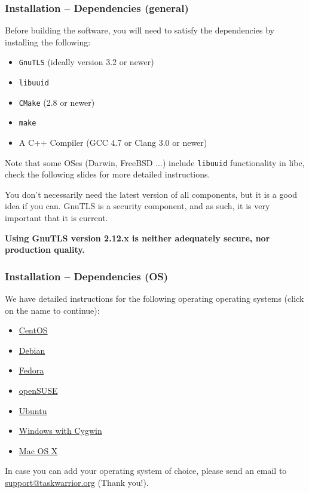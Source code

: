 \documentclass[t,handout]{beamer}
\begin{document}
\begin{frame}[fragile]\frametitle{Installation -- Dependencies (general)}
    Before building the software, you will need to satisfy the dependencies by installing the following:

    \begin{itemize}
        \item \verb+GnuTLS+ (ideally version 3.2 or newer)
        \item \verb+libuuid+
        \item \verb+CMake+ (2.8 or newer)
        \item \verb+make+
        \item A C++ Compiler (GCC 4.7 or Clang 3.0 or newer)
    \end{itemize}

    Note that some OSes (Darwin, FreeBSD ...) include \verb+libuuid+ functionality in libc, check the following slides for more detailed instructions.

    You don't necessarily need the latest version of all components, but it is a good idea if you can.  GnuTLS is a security component, and as such, it is very important that it is current.

    \textbf{Using GnuTLS version 2.12.x is neither adequately secure, nor production quality.}
\end{frame}

\begin{frame}[fragile]\frametitle{Installation -- Dependencies (OS)}
    We have detailed instructions for the following operating operating systems (click on the name to continue):

    \begin{itemize}
        \item \hyperlink{centos}{CentOS}
        \item \hyperlink{debian}{Debian}
        \item \hyperlink{fedora}{Fedora}
        \item \hyperlink{opensuse}{openSUSE}
        \item \hyperlink{ubuntu}{Ubuntu}
        \item \hyperlink{windows}{Windows with Cygwin}
        \item \hyperlink{macosx}{Mac OS X}
    \end{itemize}

    In case you can add your operating system of choice, please send an email to \href{mailto:support@taskwarrior.org}{support@taskwarrior.org} (Thank you!).
\end{frame}
\end{document}
